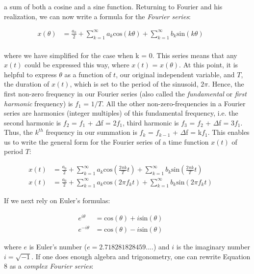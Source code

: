 \noindent a sum of both a cosine and a sine function. Returning to Fourier and his realization, we can now write a formula for the \textit{Fourier series}:

\begin{align}
x(\theta) &= \frac{a_0}{2} + \sum_{k=1}^{\infty} a_k \mathrm{cos}(k\theta) + \sum_{k=1}^{\infty} b_k \mathrm{sin}(k\theta) \qquad \\
\end{align}

\noindent where we have simplified for the case when k = 0. This series means that  any $x(t)$ could be expressed this way, where $x(t)$ = $x(\theta)$. At this point, it is helpful to express $\theta$ as a function of $t$, our original independent variable, and $T$, the duration of $x(t)$, which is set to the period of the sinusoid, $2\pi$. Hence, the first non-zero frequency in our Fourier series (also called the \emph{fundamental} or \emph{first harmonic} frequency) is $f_1$ = $1/T$. All the other non-zero-frequencies in a Fourier series are harmonics (integer multiples) of this fundamental frequency, i.e. the second harmonic is $f_2$ = $f_1$ + $\Delta$f = 2$f_1$, third harmonic is  $f_3$ = $f_2$ + $\Delta$f = 3$f_1$. Thus, the $k^{th}$ frequency in our summation is $f_k$ = $f_{k-1}$ + $\Delta$f = k$f_1$. This enables us to write the general form for the Fourier series of a time function $x(t)$ of period $T$:

\begin{align}
x(t) &= \frac{a_0}{2} + \sum_{k=1}^{\infty} a_k \mathrm{cos}(\frac{2\pi k}{T}t) + \sum_{k=1}^{\infty} b_k \mathrm{sin}(\frac{2\pi k}{T}t) \\
x(t) &= \frac{a_0}{2} + \sum_{k=1}^{\infty} a_k \mathrm{cos}(2\pi f_k t) + \sum_{k=1}^{\infty} b_k \mathrm{sin}(2\pi f_k t) \qquad 
\end{align}

\noindent If we next rely on Euler's formulas:

\begin{align}
e^{i\theta} &= \mathrm{cos}(\theta) + i \mathrm{sin}(\theta) \\
e^{-i\theta} &= \mathrm{cos}(\theta) - i \mathrm{sin}(\theta) \qquad 
\end{align}

\noindent where $e$ is Euler's number ($e = 2.718281828459 .... $) and $i$ is the imaginary number $i = \sqrt{-1}$. If one does enough algebra and trigonometry, one can rewrite Equation 8 as a \textit{complex Fourier series}:

